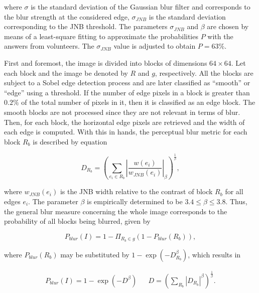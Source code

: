 \noindent where $\sigma$ is the standard deviation of the Gaussian blur filter and corresponds to the blur strength at the considered edge, $\sigma_{JNB}$ is the standard deviation corresponding to the JNB threshold. The parameters $\sigma_{JNB}$ and $\beta$ are chosen by means of a least-square fitting to approximate the probabilities $P$ with the answers from volunteers. The $\sigma_{JNB}$ value is adjusted to obtain $P = 63\%$.

First and foremost, the image is divided into blocks of dimensions $64 \times 64$. Let each block and the image be denoted by $R$ and $g$, respectively. All the blocks are subject to a Sobel edge detection process and are later classified as “smooth” or “edge” using a threshold. If the number of edge pixels in a block is greater than $0.2\%$ of the total number of pixels in it, then it is classified as an edge block. The smooth blocks are not processed since they are not relevant in terms of blur. Then, for each block, the horizontal edge pixels are retrieved and the width of each edge is computed. With this in hands, the perceptual blur metric for each block $R_{b}$ is described by equation 

\begin{equation}
\label{eqn:perceptual_blur_metric}
D_{R_{b}} = \left(
\sum_{e_{i} \in R_{b}}
\left|
\frac{w(e_{i})}{w_{JNB}(e_{i})}
\right|_{\beta}
\right)^{\frac{1}{\beta}},
\end{equation}

\noindent where $w_{JNB}(e_{i})$ is the JNB width relative to the contrast of block $R_{b}$ for all edges $e_{i}$. The parameter $\beta$ is empirically determined to be $3.4 \leq \beta \leq 3.8$. Thus, the general blur measure concerning the whole image corresponds to the probability of all blocks being blurred, given by

\begin{equation}
\label{eqn:p_blur}
    P_{blur}(I) = 1 - \Pi_{R_{b} \in g}
    \left(
    1 - P_{blur}(R_{b})
    \right),
\end{equation}

\noindent where $P_{blur}(R_{b})$ may be substituted by $1 - \exp{\left(-D_{R_{b}}^{\beta} \right)}$, which results in

\begin{align}
\label{eqn:p_blur_final}
    P_{blur}(I) = 1 - \exp{\left(-D^{\beta}\right)}
&&
D = \left(
    \sum_{R_{b}}
    \left|D_{R_{b}}
    \right|^{\beta}
    \right)^{\frac{1}{\beta}}.
\end{align}

